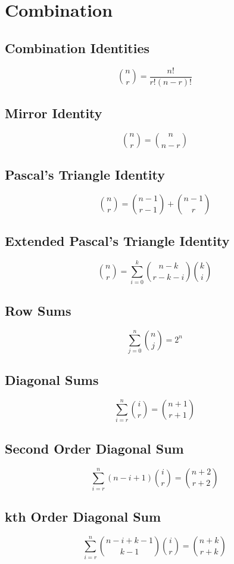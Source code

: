 \section{Combination}

\subsection{Combination Identities}
\begin{equation}
{{n}\choose{r}} = \frac{n!}{r!(n-r)!}
\end{equation}

\subsection{Mirror Identity}
\begin{equation}
{{n}\choose{r}} = {{n}\choose{n-r}}
\end{equation}

\subsection{Pascal's Triangle Identity}
\begin{equation}
{{n}\choose{r}} = {{n-1}\choose{r-1}} + {{n-1}\choose{r}}
\end{equation}

\subsection{Extended Pascal's Triangle Identity}
\begin{equation}
{{n}\choose{r}} = \sum \limits_{i=0}^k{{{n-k}\choose{r-k-i}}{{k}\choose{i}}}
\end{equation}

\subsection{Row Sums}
\begin{equation}
\sum \limits_{j=0}^n{{n}\choose{j}} = 2^n
\end{equation}

\subsection{Diagonal Sums}
\begin{equation}
\sum \limits_{i=r}^n{{i}\choose{r}} = {{n+1}\choose{r+1}}
\end{equation}

\subsection{Second Order Diagonal Sum}
\begin{equation}
\sum \limits_{i=r}^n{(n-i+1){{i}\choose{r}}} = {{n+2}\choose{r+2}}
\end{equation}

\subsection{kth Order Diagonal Sum}
\begin{equation}
\sum \limits_{i=r}^n{{{n-i+k-1}\choose{k-1}}{{i}\choose{r}}} = {{n+k}\choose{r+k}}
\end{equation}
